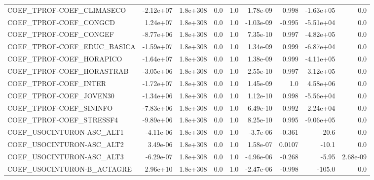 \begin{tabular}{lrrrrrrrr}
COEF\_TPROF-COEF\_CLIMASECO         &   -2.12e+07 &     1.8e+308 &     0.0 &      1.0 &   1.78e-09 &       0.998 &    -1.63e+05 &           0.0 \\
COEF\_TPROF-COEF\_CONGCD            &    1.24e+07 &     1.8e+308 &     0.0 &      1.0 &  -1.03e-09 &      -0.995 &    -5.51e+04 &           0.0 \\
COEF\_TPROF-COEF\_CONGEF            &   -8.77e+06 &     1.8e+308 &     0.0 &      1.0 &   7.35e-10 &       0.997 &    -4.82e+05 &           0.0 \\
COEF\_TPROF-COEF\_EDUC\_BASICA       &   -1.59e+07 &     1.8e+308 &     0.0 &      1.0 &   1.34e-09 &       0.999 &    -6.87e+04 &           0.0 \\
COEF\_TPROF-COEF\_HORAPICO          &   -1.64e+07 &     1.8e+308 &     0.0 &      1.0 &   1.38e-09 &       0.999 &    -4.11e+05 &           0.0 \\
COEF\_TPROF-COEF\_HORASTRAB         &   -3.05e+06 &     1.8e+308 &     0.0 &      1.0 &   2.55e-10 &       0.997 &     3.12e+05 &           0.0 \\
COEF\_TPROF-COEF\_INTER             &   -1.72e+07 &     1.8e+308 &     0.0 &      1.0 &   1.45e-09 &         1.0 &     4.58e+06 &           0.0 \\
COEF\_TPROF-COEF\_JOVEN30           &   -1.34e+06 &     1.8e+308 &     0.0 &      1.0 &   1.12e-10 &       0.998 &    -5.56e+04 &           0.0 \\
COEF\_TPROF-COEF\_SININFO           &   -7.83e+06 &     1.8e+308 &     0.0 &      1.0 &   6.49e-10 &       0.992 &     2.24e+04 &           0.0 \\
COEF\_TPROF-COEF\_STRESSF4          &   -9.89e+06 &     1.8e+308 &     0.0 &      1.0 &   8.25e-10 &       0.995 &    -9.06e+05 &           0.0 \\
COEF\_USOCINTURON-ASC\_ALT1         &   -4.11e-06 &     1.8e+308 &     0.0 &      1.0 &   -3.7e-06 &      -0.361 &        -20.6 &           0.0 \\
COEF\_USOCINTURON-ASC\_ALT2         &    3.49e-06 &     1.8e+308 &     0.0 &      1.0 &   1.58e-07 &      0.0107 &        -10.1 &           0.0 \\
COEF\_USOCINTURON-ASC\_ALT3         &   -6.29e-07 &     1.8e+308 &     0.0 &      1.0 &  -4.96e-06 &      -0.268 &        -5.95 &      2.68e-09 \\
COEF\_USOCINTURON-B\_ACTAGRE        &    2.96e+10 &     1.8e+308 &     0.0 &      1.0 &  -2.47e-06 &      -0.998 &       -105.0 &           0.0 \\

\end{tabular}
